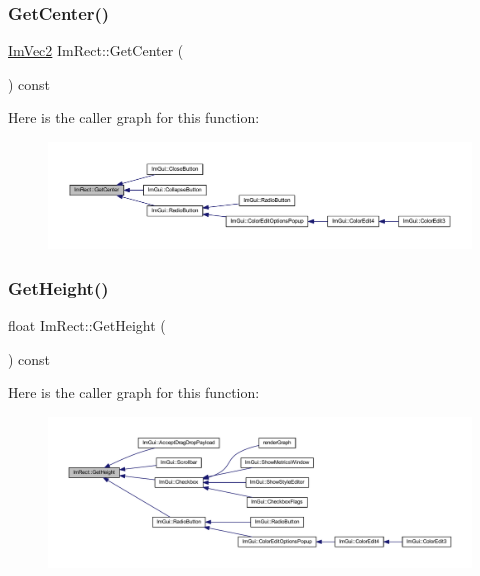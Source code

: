 \mbox{\label{struct_im_rect_aae13f8003184fd84f29d27c3c074cf43}} 
\subsubsection{\texorpdfstring{Get\+Center()}{GetCenter()}}
{\footnotesize\ttfamily \mbox{\hyperlink{struct_im_vec2}{Im\+Vec2}} Im\+Rect\+::\+Get\+Center (\begin{DoxyParamCaption}{ }\end{DoxyParamCaption}) const\hspace{0.3cm}{\ttfamily [inline]}}

Here is the caller graph for this function\+:
\nopagebreak
\begin{figure}[H]
\begin{center}
\leavevmode
\includegraphics[width=350pt]{struct_im_rect_aae13f8003184fd84f29d27c3c074cf43_icgraph}
\end{center}
\end{figure}
\mbox{\label{struct_im_rect_a748d8ae9cb26508951ec6e2f2df0625b}} 
\subsubsection{\texorpdfstring{Get\+Height()}{GetHeight()}}
{\footnotesize\ttfamily float Im\+Rect\+::\+Get\+Height (\begin{DoxyParamCaption}{ }\end{DoxyParamCaption}) const\hspace{0.3cm}{\ttfamily [inline]}}

Here is the caller graph for this function\+:
\nopagebreak
\begin{figure}[H]
\begin{center}
\leavevmode
\includegraphics[width=350pt]{struct_im_rect_a748d8ae9cb26508951ec6e2f2df0625b_icgraph}
\end{center}
\end{figure}
\mbox{\label{struct_im_rect_ae459d9c50003058cfb34519a571aaf33}} 
